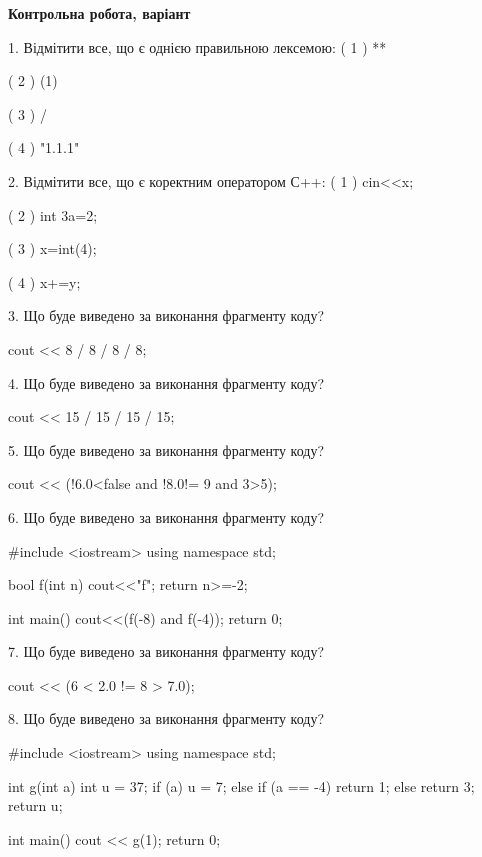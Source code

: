 \documentclass[11pt, ukrainian]{article}
\begin{document}
\begin{large}
\textbf{Контрольна робота, варіант }\par

1. Відмітити все, що є однією правильною лексемою:
( 1 ) **

( 2 ) (1)

( 3 ) /

( 4 ) "1.1.1"


2. Відмітити все, що є коректним оператором С++:
( 1 ) cin<<x;

( 2 ) int 3a=2;

( 3 ) x=int(4);

( 4 ) x+=y;


3. Що буде виведено за виконання фрагменту коду?

cout << 8 / 8 / 8 / 8;


4. Що буде виведено за виконання фрагменту коду?

cout << 15 / 15 / 15 / 15;


5. Що буде виведено за виконання фрагменту коду?

cout << (!6.0<false and !8.0!= 9 and 3>5);


6. Що буде виведено за виконання фрагменту коду?

#include <iostream>
using namespace std;

bool f(int n){
    cout<<"f";
    return n>=-2;
}

int main(){
    cout<<(f(-8) and f(-4));
    return 0;
}


7. Що буде виведено за виконання фрагменту коду?

cout << (6 < 2.0 != 8 > 7.0);


8. Що буде виведено за виконання фрагменту коду?

#include <iostream>
using namespace std;

int g(int a){
    int u = 37;
    if (a) 
        u = 7;
    else if (a == -4)
         return 1;
    else
         return 3;
    return u;
}

int main(){
    cout << g(1);
    return 0;
}



\end{large}
\end{document}
